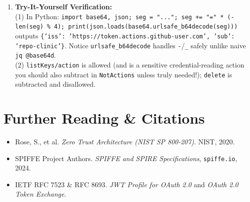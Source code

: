 \begin{enumerate}[leftmargin=18pt]
  \item \textbf{Try-It-Yourself Verification:}\\
  (1) In Python: \texttt{import base64, json; seg = "..."; seg += "=" * (-len(seg) \% 4); print(json.loads(base64.urlsafe\_b64decode(seg)))} outputs \texttt{\{'iss': 'https://token.actions.github-user.com', 'sub': 'repo-clinic'\}}. Notice \texttt{urlsafe\_b64decode} handles \texttt{-}/\texttt{\_} safely unlike naive \texttt{jq @base64d}.\\
  (2) \texttt{listKeys/action} is allowed (and is a sensitive credential-reading action you should also subtract in \texttt{NotActions} unless truly needed!); \texttt{delete} is subtracted and disallowed.
\end{enumerate}

\section{Further Reading \protect\& Citations}
\begin{itemize}[leftmargin=15pt]
  \item Rose, S., et al. \emph{Zero Trust Architecture (NIST SP 800-207)}. NIST, 2020.
  \item SPIFFE Project Authors. \emph{SPIFFE and SPIRE Specifications}, \texttt{spiffe.io}, 2024.
  \item IETF RFC 7523 \& RFC 8693. \emph{JWT Profile for OAuth 2.0} and \emph{OAuth 2.0 Token Exchange}.
\end{itemize}
